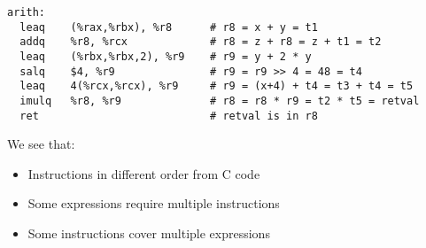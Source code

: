 \documentclass [10pt]{article}
\begin{document}
\begin{verbatim}
arith:
  leaq    (%rax,%rbx), %r8      # r8 = x + y = t1
  addq    %r8, %rcx             # r8 = z + r8 = z + t1 = t2 
  leaq    (%rbx,%rbx,2), %r9    # r9 = y + 2 * y
  salq    $4, %r9               # r9 = r9 >> 4 = 48 = t4
  leaq    4(%rcx,%rcx), %r9     # r9 = (x+4) + t4 = t3 + t4 = t5
  imulq   %r8, %r9              # r8 = r8 * r9 = t2 * t5 = retval
  ret                           # retval is in r8
\end{verbatim}

We see that:

\begin{itemize}
  \item Instructions in different order from C code
  \item Some expressions require multiple instructions
  \item Some instructions cover multiple expressions
\end{itemize}
\end{document}
